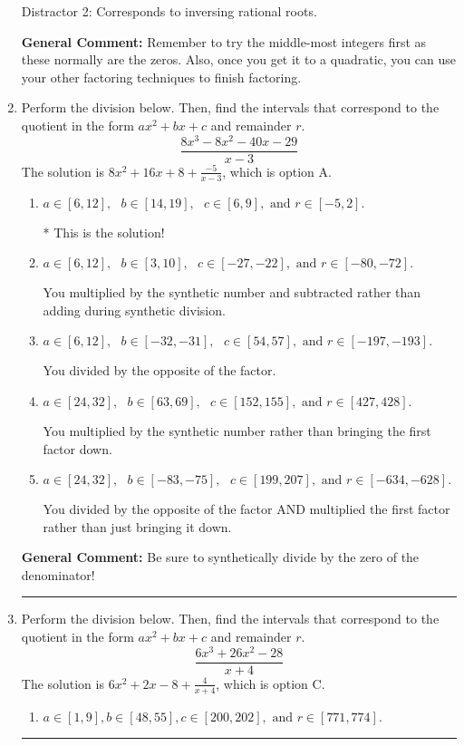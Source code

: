 \documentclass{extbook}[14pt]
\newcommand{\litem}[1]{\item #1

\rule{\textwidth}{0.4pt}}
\begin{document}
\begin{enumerate}
{\begin{enumerate}[label=\Alph*.]
 Distractor 2: Corresponds to inversing rational roots.
\end{enumerate}

\textbf{General Comment:} Remember to try the middle-most integers first as these normally are the zeros. Also, once you get it to a quadratic, you can use your other factoring techniques to finish factoring.
}
\litem{
Perform the division below. Then, find the intervals that correspond to the quotient in the form $ax^2+bx+c$ and remainder $r$.
\[ \frac{8x^{3} -8 x^{2} -40 x -29}{x -3} \]The solution is \( 8x^{2} +16 x + 8 + \frac{-5}{x -3} \), which is option A.\begin{enumerate}[label=\Alph*.]
\item \( a \in [6, 12], \text{   } b \in [14, 19], \text{   } c \in [6, 9], \text{   and   } r \in [-5, 2]. \)

* This is the solution!
\item \( a \in [6, 12], \text{   } b \in [3, 10], \text{   } c \in [-27, -22], \text{   and   } r \in [-80, -72]. \)

 You multiplied by the synthetic number and subtracted rather than adding during synthetic division.
\item \( a \in [6, 12], \text{   } b \in [-32, -31], \text{   } c \in [54, 57], \text{   and   } r \in [-197, -193]. \)

 You divided by the opposite of the factor.
\item \( a \in [24, 32], \text{   } b \in [63, 69], \text{   } c \in [152, 155], \text{   and   } r \in [427, 428]. \)

 You multiplied by the synthetic number rather than bringing the first factor down.
\item \( a \in [24, 32], \text{   } b \in [-83, -75], \text{   } c \in [199, 207], \text{   and   } r \in [-634, -628]. \)

 You divided by the opposite of the factor AND multiplied the first factor rather than just bringing it down.
\end{enumerate}

\textbf{General Comment:} Be sure to synthetically divide by the zero of the denominator!
}
\litem{
Perform the division below. Then, find the intervals that correspond to the quotient in the form $ax^2+bx+c$ and remainder $r$.
\[ \frac{6x^{3} +26 x^{2} -28}{x + 4} \]The solution is \( 6x^{2} +2 x -8 + \frac{4}{x + 4} \), which is option C.\begin{enumerate}[label=\Alph*.]
\item \( a \in [1, 9], b \in [48, 55], c \in [200, 202], \text{ and } r \in [771, 774]. \)


\end{enumerate}}
\end{enumerate}
\end{document}

